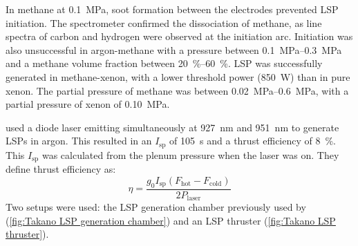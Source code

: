         In methane at \qty{0.1}{MPa}, soot formation between the electrodes prevented LSP initiation. The spectrometer confirmed the dissociation of methane, as line spectra of carbon and hydrogen were observed at the initiation arc. Initiation was also unsuccessful in argon-methane with a pressure between \qtyrange{0.1}{0.3}{MPa} and a methane volume fraction between \qtyrange{20}{60}{\%}. LSP was successfully generated in methane-xenon, with a lower threshold power (\qty{850}{W}) than in pure xenon. The partial pressure of methane was between \qtyrange{0.02}{0.6}{MPa}, with a partial pressure of xenon of \qty{0.10}{MPa}.

        \textcite{takanoDemonstrationDiodeLasersustained} used a diode laser emitting simultaneously at \qty{927}{nm} and \qty{951}{nm} to generate LSPs in argon. This resulted in an $I_\mathrm{sp}$ of \qty{105}{s} and a thrust efficiency of \qty{8}{\%}. This $I_\mathrm{sp}$ was calculated from the plenum pressure when the laser was on. They define thrust efficiency as:
        \[
        \eta = \frac{g_0 I_\mathrm{sp} (F_\mathrm{hot}-F_\mathrm{cold})}{2 P_\mathrm{laser}}
        \]
        Two setups were used: the LSP generation chamber previously used by \textcite{kameiMethaneMethaneXenon2020} (\autoref{fig:Takano LSP generation chamber}) and an LSP thruster (\autoref{fig:Takano LSP thruster}).
